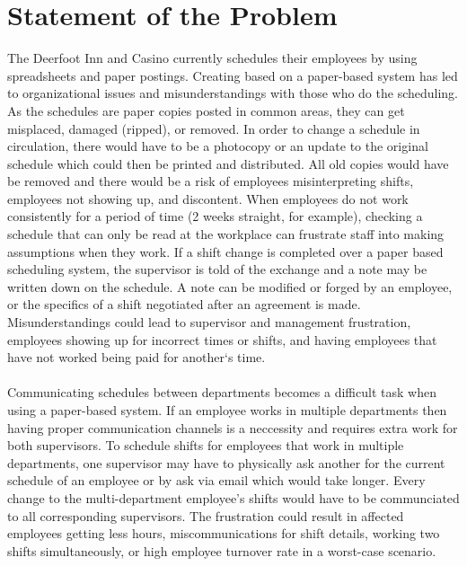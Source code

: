 \documentclass[letterpaper,12pt]{report}
\begin{document}
\section{Statement of the Problem}
\hspace{1cm} The Deerfoot Inn and Casino currently schedules their employees by using spreadsheets and paper postings. Creating  based on a paper-based system has led to organizational issues and misunderstandings with those who do the scheduling. As the schedules are paper copies posted in common areas, they can get misplaced, damaged (ripped), or removed. In order to change a schedule in circulation, there would have to be a photocopy or an update to the original schedule which could then be printed and distributed. All old copies would have be removed and there would be a risk of employees misinterpreting shifts, employees not showing up, and discontent. When employees do not work consistently for a period of time (2 weeks straight, for example), checking a schedule that can only be read at the workplace can frustrate staff into making assumptions when they work. If a shift change is completed over a paper based scheduling system, the supervisor is told of the exchange and a note may be written down on the schedule. A note can be modified or forged by an employee, or the specifics of a shift negotiated after an agreement is made. Misunderstandings could lead to supervisor and management frustration, employees showing up for incorrect times or shifts, and having employees that have not worked being paid for another`s time.
\paragraph{}\hspace{0.6cm}Communicating schedules between departments becomes a difficult task when using a paper-based system. If an employee works in multiple departments then having proper communication channels is a neccessity and requires extra work for both supervisors. To schedule shifts for employees that work in multiple departments, one supervisor may have to physically ask another for the current schedule of an employee or by ask via email which would take longer. Every change to the multi-department employee's shifts would have to be communciated to all corresponding supervisors. The frustration could result in affected employees getting less hours, miscommunications for shift details, working two shifts simultaneously, or high employee turnover rate in a worst-case scenario.
\end{document}
